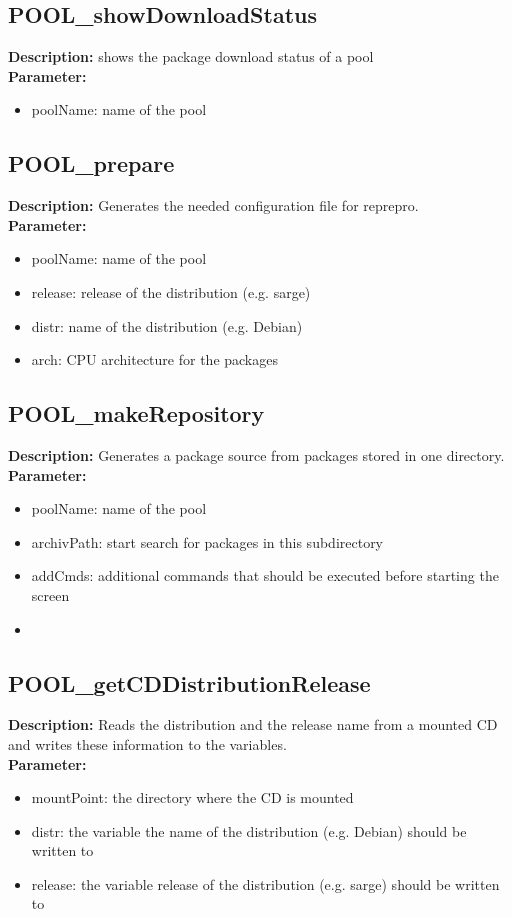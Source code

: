 \subsection{POOL\_showDownloadStatus}
\textbf{Description:} shows the package download status of a pool\\
\textbf{Parameter:}
\begin{itemize}
\item poolName: name of the pool
\end{itemize}

\subsection{POOL\_prepare}
\textbf{Description:} Generates the needed configuration file for reprepro.\\
\textbf{Parameter:}
\begin{itemize}
\item poolName: name of the pool
\item release: release of the distribution (e.g. sarge)
\item distr: name of the distribution (e.g. Debian)
\item arch: CPU architecture for the packages
\end{itemize}

\subsection{POOL\_makeRepository}
\textbf{Description:} Generates a package source from packages stored in one directory.\\
\textbf{Parameter:}
\begin{itemize}
\item poolName: name of the pool
\item archivPath: start search for packages in this subdirectory
\item addCmds: additional commands that should be executed before starting the screen
\item 
\end{itemize}

\subsection{POOL\_getCDDistributionRelease}
\textbf{Description:} Reads the distribution and the release name from a mounted CD and writes these information to the variables. \\
\textbf{Parameter:}
\begin{itemize}
\item mountPoint: the directory where the CD is mounted
\item distr: the variable the name of the distribution (e.g. Debian) should be written to
\item release: the variable release of the distribution (e.g. sarge) should be written to
\end{itemize}

